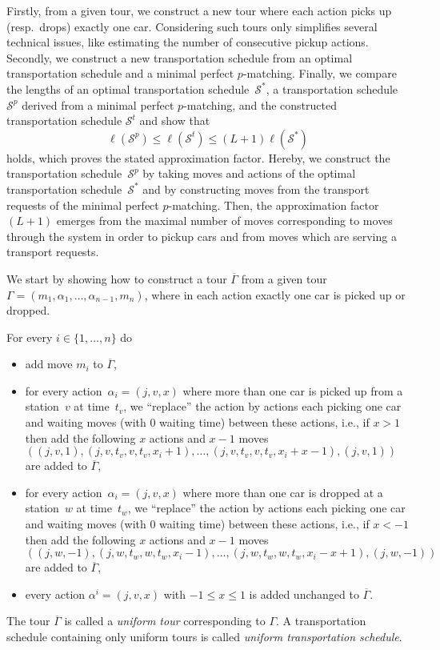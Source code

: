 \documentclass[english]{llncs}
\numberwithin{sublemma}{lemma}
\newcommand{\ntourd}{\ensuremath{n}}
\newcommand{\tourd}{\ensuremath{\Gamma}}
\newcommand{\action}{\ensuremath{\alpha}}
\newcommand{\move}{\ensuremath{m}}
\newcommand{\sched}{\mathcal{S}}
\begin{document}
Firstly, from a given tour, we construct a new tour where each action picks up (resp.~drops) exactly one car.
Considering such tours only simplifies several technical issues, like estimating the number of consecutive pickup actions.
Secondly, we construct a new transportation schedule from an optimal transportation schedule and a minimal perfect $p$-matching.
Finally, we compare the lengths of an optimal transportation schedule~$\sched^*$, a transportation schedule $\sched^p$ derived from a minimal perfect $p$-matching, and the constructed transportation schedule $\sched^t$ and show that
\[
  \ell(\sched^p) \leq \ell(\sched^t) \leq (L + 1) \ell(\sched^*)
\]
holds, which proves the stated approximation factor.
Hereby, we construct the transportation schedule~$\sched^p$ by taking moves and actions of the optimal transportation schedule~$\sched^*$ and
by constructing moves from the transport requests of the minimal perfect $p$-matching.
Then, the approximation factor $(L + 1)$ emerges from the maximal number of moves corresponding to moves through the system in order to pickup cars and from moves which are serving a transport requests.


We start by showing how to construct a tour $\overline{\tourd}$ from a given tour $\tourd = (\move_1, \action_1, \dotsc, \action_{\ntourd - 1}, \move_{\ntourd})$, where in each action exactly one car is picked up or dropped.

For every $i \in \{ 1, \dotsc, \ntourd \}$ do
\begin{itemize}
 \item add move $\move_i$ to $\overline{\tourd}$,
 \item for every action~$\action_i = (j, v, x)$ where more than one car is picked up from a station~$v$ at time~$t_v$, we ``replace'' the action by actions each picking one car and waiting moves (with 0 waiting time) between these actions,
       i.e., if $x > 1$ then add the following $x$ actions and $x-1$ moves 
       $((j, v, 1), (j, v, t_v, v, t_v, x_{i} + 1), \dotsc, (j, v, t_v, v, t_v, x_{i} + x - 1), (j, v, 1))$ are added to $\overline{\tourd}$,
 \item for every action~$\action_i = (j, v, x)$ where more than one car is dropped at a station~$w$ at time~$t_w$, we ``replace'' the action by actions each picking one car and waiting moves (with 0 waiting time) between these actions,
       i.e., if $x < -1$ then add the following $x$ actions and $x-1$ moves 
       $((j, w, -1), (j, w, t_w, w, t_w, x_{i} - 1), \dotsc, (j, w, t_w, w, t_w, x_{i} - x  + 1), (j, w, -1))$ are added to $\overline{\tourd}$,
 \item every action $\action^i = (j, v, x)$ with $-1 \leq x \leq 1$ is added unchanged to $\overline{\tourd}$.
\end{itemize}
The tour $\overline{\tourd}$ is called a \emph{uniform tour} corresponding to $\tourd$.
A transportation schedule containing only uniform tours is called \emph{uniform transportation schedule}.
\end{document}
